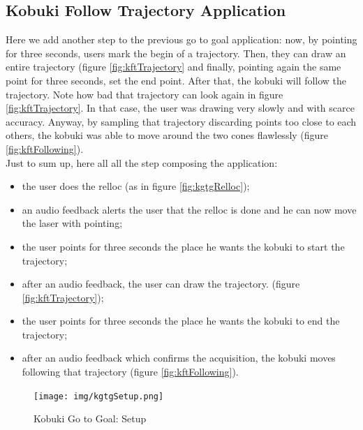 \subsection{Kobuki Follow Trajectory Application}
Here we add another step to the previous go to goal application: now, by pointing for three seconds, users mark the begin of a trajectory. Then, they can draw an entire trajectory (figure \ref{fig:kftTrajectory} and finally, pointing again the same point for three seconds, set the end point. After that, the kobuki will follow the trajectory. Note how bad that trajectory can look again in figure \ref{fig:kftTrajectory}. In that case, the user was drawing very slowly and with scarce accuracy. Anyway, by sampling that trajectory discarding points too close to each others, the kobuki was able to move around the two cones flawlessly (figure \ref{fig:kftFollowing}).\\
Just to sum up, here all all the step composing the application:
\begin{itemize}
    \item the user does the relloc (as in figure \ref{fig:kgtgRelloc});
    \item an audio feedback alerts the user that the relloc is done and he can now move the laser with pointing;
    \item the user points for three seconds the place he wants the kobuki to start the trajectory;
    \item after an audio feedback, the user can draw the trajectory. (figure \ref{fig:kftTrajectory});
    \item the user points for three seconds the place he wants the kobuki to end the trajectory;
    \item after an audio feedback which confirms the acquisition, the kobuki moves following that trajectory (figure \ref{fig:kftFollowing}).
\end{itemize}
\begin{figure}
	\centering
	\texttt{[image: img/kgtgSetup.png]}%
	\caption{Kobuki Go to Goal: Setup}
	\label{fig:kgtgSetup}
\end{figure}
